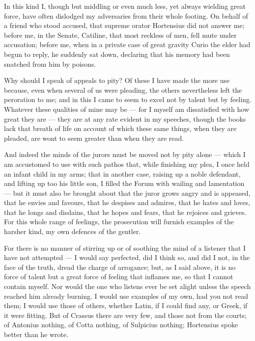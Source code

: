  In this kind I, though but middling or even much less, yet always wielding great force, have often dislodged my adversaries from their whole footing. On behalf of a friend who stood accused, that supreme orator Hortensius did not answer me; before me, in the Senate, Catiline, that most reckless of men, fell mute under accusation; before me, when in a private case of great gravity Curio the elder had begun to reply, he suddenly sat down, declaring that his memory had been snatched from him by poisons.

 Why should I speak of appeals to pity? Of these I have made the more use because, even when several of us were pleading, the others nevertheless left the peroration to me; and in this I came to seem to excel not by talent but by feeling. Whatever these qualities of mine may be — for I myself am dissatisfied with how great they are — they are at any rate evident in my speeches, though the books lack that breath of life on account of which these same things, when they are pleaded, are wont to seem greater than when they are read.

 And indeed the minds of the jurors must be moved not by pity alone — which I am accustomed to use with such pathos that, while finishing my plea, I once held an infant child in my arms; that in another case, raising up a noble defendant, and lifting up too his little son, I filled the Forum with wailing and lamentation — but it must also be brought about that the juror grows angry and is appeased, that he envies and favours, that he despises and admires, that he hates and loves, that he longs and disdains, that he hopes and fears, that he rejoices and grieves. For this whole range of feelings, the prosecution will furnish examples of the harsher kind, my own defences of the gentler.

 For there is no manner of stirring up or of soothing the mind of a listener that I have not attempted — I would say perfected, did I think so, and did I not, in the face of the truth, dread the charge of arrogance; but, as I said above, it is no force of talent but a great force of feeling that inflames me, so that I cannot contain myself. Nor would the one who listens ever be set alight unless the speech reached him already burning. I would use examples of my own, had you not read them; I would use those of others, whether Latin, if I could find any, or Greek, if it were fitting. But of Crassus there are very few, and those not from the courts; of Antonius nothing, of Cotta nothing, of Sulpicius nothing; Hortensius spoke better than he wrote.

